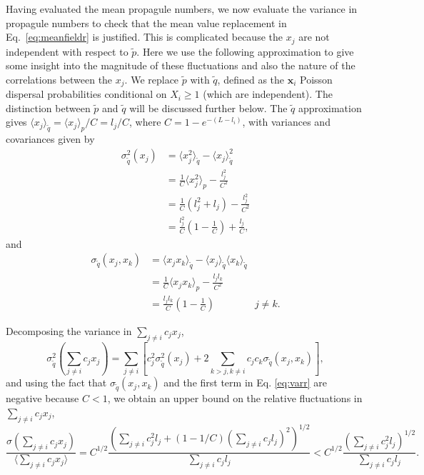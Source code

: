 \documentclass[12pt]{article}
\begin{document}
Having evaluated the mean propagule numbers, we now evaluate the variance in propagule numbers to check that the mean value replacement in Eq.~\eqref{eq:meanfieldr} is justified. This is complicated because the $x_j$ are not independent with respect to $\tilde{p}$. Here we use the following approximation to give some insight into the magnitude of these fluctuations and also the nature of the correlations between the $x_j$. We replace $\tilde{p}$ with $\tilde{q}$, defined as the ${\mathbf x_i}$ Poisson dispersal probabilities conditional on $X_i\geq1$ (which are independent). The distinction between $\tilde{p}$ and $\tilde{q}$ will be discussed further below. The $\tilde{q}$ approximation gives $\langle x_j \rangle_{\tilde{q}}=\langle x_j \rangle_p/C=l_j/C$, where $C=1-e^{-(L-l_i)}$, with variances and covariances given by
\begin{align}
\sigma_{\tilde{q}}^2(x_j)&=\langle x_j^2 \rangle_{\tilde{q}}-\langle x_j \rangle_{\tilde{q}}^2\nonumber\\
&=\frac{1}{C}\langle x_j^2 \rangle_p-\frac{l_j^2}{C^2}\nonumber \\
&=\frac{1}{C}(l_j^2 + l_j)-\frac{l_j^2}{C^2}\nonumber \\
&=\frac{l_j^2}{C}\left(1-\frac{1}{C}\right)+\frac{l_j}{C},\label{eq:varr}
\end{align}
and 
\begin{align}
\sigma_{\tilde{q}}(x_j,x_k)&=\langle x_j x_k \rangle_{\tilde{q}}-\langle x_j \rangle_{\tilde{q}}\langle x_k \rangle_{\tilde{q}}\nonumber\\
&=\frac{1}{C}\langle x_j x_k \rangle_p-\frac{l_jl_k}{C^2}\nonumber\\
&=\frac{l_j l_k}{C}\left(1-\frac{1}{C}\right)\qquad\qquad j\neq k. \label{eq:covr}
\end{align} 

Decomposing the variance in $\sum_{j\neq i} c_j x_j$,
\begin{equation}
\sigma_{\tilde{q}}^2(\sum_{j\neq i} c_j x_j)=\sum_{j\neq i}\left[c_j^2\sigma_{\tilde{q}}^2(x_j)+2\sum_{k>j, k\neq i}c_j c_k\sigma_{\tilde{q}}(x_j,x_k)\right],\label{eq:vartotr}
\end{equation}
and using the fact that $\sigma_{\tilde{q}}(x_j,x_k)$ and the first term in Eq. \eqref{eq:varr} are negative because $C<1$, we obtain an upper bound on the relative fluctuations in $\sum_{j\neq i} c_j x_j$, 
\begin{equation}
\frac{\sigma(\sum_{j\neq i} c_j x_j)}{\langle\sum_{j\neq i} c_j x_j\rangle}=C^{1/2}\frac{\left(\sum_{j\neq i}c_j^2 l_j+(1-1/C)\left(\sum_{j\neq i}c_j l_j\right)^2 \right)^{1/2}}{\sum_{j\neq i}c_j l_j}<C^{1/2}\frac{\left(\sum_{j\neq i}c_j^2 l_j\right)^{1/2}}{\sum_{j\neq i}c_j l_j}. \label{eq:cvr}
\end{equation}
\end{document}
